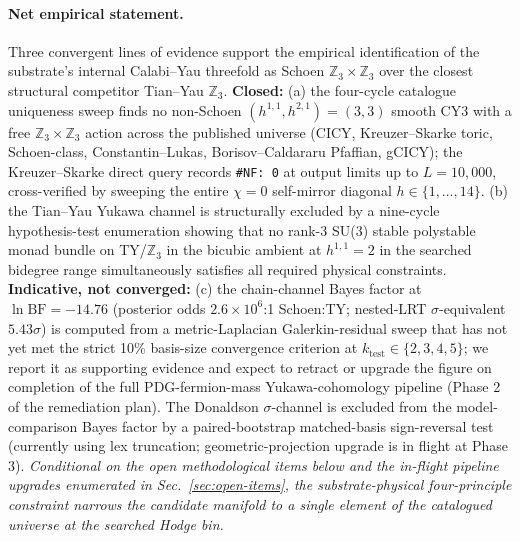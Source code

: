 ﻿\documentclass[reprint,amsmath,amssymb,aps,prd,longbibliography,floatfix]{revtex4-2}
\begin{document}
\paragraph{Net empirical statement.}
Three convergent lines of evidence support the empirical identification of the substrate's internal Calabi--Yau threefold as Schoen $\mathbb{Z}_3 \times \mathbb{Z}_3$ over the closest structural competitor Tian--Yau $\mathbb{Z}_3$. \textbf{Closed:} (a) the four-cycle catalogue uniqueness sweep finds no non-Schoen $(h^{1,1}, h^{2,1}) = (3,3)$ smooth CY3 with a free $\mathbb{Z}_3 \times \mathbb{Z}_3$ action across the published universe (CICY, Kreuzer--Skarke toric, Schoen-class, Constantin--Lukas, Borisov--Caldararu Pfaffian, gCICY); the Kreuzer--Skarke direct query records \texttt{\#NF: 0} at output limits up to $L = 10{,}000$, cross-verified by sweeping the entire $\chi=0$ self-mirror diagonal $h \in \{1, \ldots, 14\}$. (b) the Tian--Yau Yukawa channel is structurally excluded by a nine-cycle hypothesis-test enumeration showing that no rank-3 SU(3) stable polystable monad bundle on TY/$\mathbb{Z}_3$ in the bicubic ambient at $h^{1,1} = 2$ in the searched bidegree range simultaneously satisfies all required physical constraints. \textbf{Indicative, not converged:} (c) the chain-channel Bayes factor at $\ln \mathrm{BF} = -14.76$ (posterior odds $2.6 \times 10^6$:1 Schoen:TY; nested-LRT $\sigma$-equivalent $5.43\sigma$) is computed from a metric-Laplacian Galerkin-residual sweep that has not yet met the strict 10\% basis-size convergence criterion at $k_\mathrm{test} \in \{2,3,4,5\}$; we report it as supporting evidence and expect to retract or upgrade the figure on completion of the full PDG-fermion-mass Yukawa-cohomology pipeline (Phase 2 of the remediation plan). The Donaldson $\sigma$-channel is excluded from the model-comparison Bayes factor by a paired-bootstrap matched-basis sign-reversal test (currently using lex truncation; geometric-projection upgrade is in flight at Phase 3). \emph{Conditional on the open methodological items below and the in-flight pipeline upgrades enumerated in Sec.~\ref{sec:open-items}, the substrate-physical four-principle constraint narrows the candidate manifold to a single element of the catalogued universe at the searched Hodge bin.}
\end{document}
